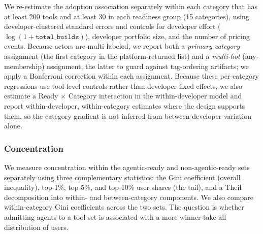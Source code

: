 We re-estimate the adoption association separately within each category that
has at least 200 tools and at least 30 in each readiness group (15 categories),
using developer-clustered standard errors and controls for developer effort
($\log(1 + \texttt{total\_builds})$), developer portfolio size, and the number
of pricing events. Because actors are multi-labeled, we report both a
\emph{primary-category} assignment (the first category in the platform-returned
list) and a \emph{multi-hot} (any-membership) assignment, the latter to guard
against tag-ordering artifacts; we apply a Bonferroni correction within each
assignment. Because these per-category regressions use tool-level controls
rather than developer fixed effects, we also estimate a Ready $\times$ Category
interaction in the within-developer model and report within-developer,
within-category estimates where the design supports them, so the category
gradient is not inferred from between-developer variation alone.

\subsubsection{Concentration}

We measure concentration within the agentic-ready and non-agentic-ready sets
separately using three complementary statistics: the Gini coefficient (overall
inequality), top-1\%, top-5\%, and top-10\% user shares (the tail), and a Theil
decomposition into within- and between-category components. We also compare
within-category Gini coefficients across the two sets. The question is whether
admitting agents to a tool set is associated with a more winner-take-all
distribution of users.
